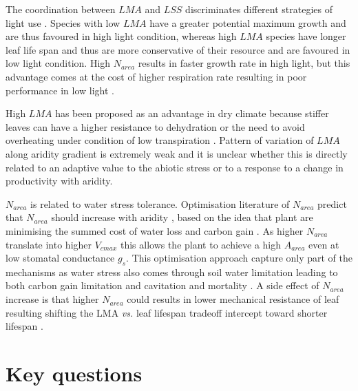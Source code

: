 \documentclass[a4paper,11pt]{article}
\begin{document}
The coordination between $LMA$ and $LSS$ discriminates different strategies of light use \citep{Falster-2018}. Species with low $LMA$ have a greater potential maximum growth and are thus favoured in high light condition, whereas high $LMA$ species have longer leaf life span and thus are more conservative of their resource and are favoured in low light condition. High $N_{area}$ results in faster growth rate in high light, but this advantage comes at the cost of higher respiration rate resulting in poor performance in low light \citep{Falster-2018}.
 

High $LMA$ has been proposed as an advantage in dry climate because
stiffer leaves can have a higher resistance to dehydration
\citep{Wright-2002a,Wright-2002b} or the need to avoid overheating
under condition of low transpiration \citep{Leigh-2012}.
Pattern of variation of $LMA$ along aridity gradient is extremely weak and it is unclear whether this is directly related to an adaptive value to the abiotic stress or to a response to a change in productivity with aridity.
 
$N_{area}$ is related to water stress tolerance. Optimisation literature of $N_{area}$ predict that $N_{area}$ should
increase with aridity \citep{Wright-2003}, based on the idea that plant are minimising the summed cost of water
loss and carbon gain
\citep{Medlyn-2002,Wright-2003,Prentice-2014,Lu-2016,Wang-2017,Dong-2017}. As
higher $N_{area}$ translate into higher $V_{cmax}$ this allows the
plant to achieve a high $A_{area}$ even at low stomatal conductance
$g_s$. This optimisation approach capture only part of the mechanisms as water stress also comes through soil water limitation leading to both carbon gain limitation and cavitation and mortality \citep{Sperry-2016,Wolf-2016,Sperry-2017}. A side effect of $N_{area}$ increase is that higher $N_{area}$ could results in lower mechanical resistance of leaf resulting shifting the LMA \textit{vs.} leaf lifespan tradeoff intercept toward shorter lifespan \citep{Wright-2002a}.

\section{Key questions}
\end{document}
